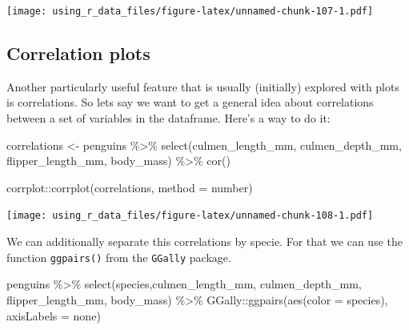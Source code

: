 \documentclass[
]{book}
\newenvironment{Shaded}{\begin{snugshade}}{\end{snugshade}}
\newcommand{\AttributeTok}[1]{\textcolor[rgb]{0.77,0.63,0.00}{#1}}
\newcommand{\FunctionTok}[1]{\textcolor[rgb]{0.00,0.00,0.00}{#1}}
\newcommand{\NormalTok}[1]{#1}
\newcommand{\OtherTok}[1]{\textcolor[rgb]{0.56,0.35,0.01}{#1}}
\newcommand{\SpecialCharTok}[1]{\textcolor[rgb]{0.00,0.00,0.00}{#1}}
\newcommand{\StringTok}[1]{\textcolor[rgb]{0.31,0.60,0.02}{#1}}
\begin{document}
\texttt{[image: using\_r\_data\_files/figure-latex/unnamed-chunk-107-1.pdf]}

\hypertarget{correlation-plots}{%
\subsection{Correlation plots}\label{correlation-plots}}

Another particularly useful feature that is usually (initially) explored with plots is correlations.
So lets say we want to get a general idea about correlations between a set of variables in the dataframe.
Here's a way to do it:

\begin{Shaded}
\begin{Highlighting}[]
\NormalTok{correlations }\OtherTok{\textless{}{-}}\NormalTok{ penguins }\SpecialCharTok{\%\textgreater{}\%} 
  \FunctionTok{select}\NormalTok{(}\StringTok{\textquotesingle{}culmen\_length\_mm\textquotesingle{}}\NormalTok{, }\StringTok{\textquotesingle{}culmen\_depth\_mm\textquotesingle{}}\NormalTok{, }\StringTok{\textquotesingle{}flipper\_length\_mm\textquotesingle{}}\NormalTok{, }\StringTok{\textquotesingle{}body\_mass\textquotesingle{}}\NormalTok{) }\SpecialCharTok{\%\textgreater{}\%} 
  \FunctionTok{cor}\NormalTok{()}

\NormalTok{corrplot}\SpecialCharTok{::}\FunctionTok{corrplot}\NormalTok{(correlations, }\AttributeTok{method =} \StringTok{\textquotesingle{}number\textquotesingle{}}\NormalTok{)}
\end{Highlighting}
\end{Shaded}

\texttt{[image: using\_r\_data\_files/figure-latex/unnamed-chunk-108-1.pdf]}

We can additionally separate this correlations by specie.
For that we can use the function \texttt{ggpairs()} from the \texttt{GGally} package.

\begin{Shaded}
\begin{Highlighting}[]
\NormalTok{penguins }\SpecialCharTok{\%\textgreater{}\%} 
  \FunctionTok{select}\NormalTok{(}\StringTok{\textquotesingle{}species\textquotesingle{}}\NormalTok{,}\StringTok{\textquotesingle{}culmen\_length\_mm\textquotesingle{}}\NormalTok{, }\StringTok{\textquotesingle{}culmen\_depth\_mm\textquotesingle{}}\NormalTok{, }\StringTok{\textquotesingle{}flipper\_length\_mm\textquotesingle{}}\NormalTok{, }\StringTok{\textquotesingle{}body\_mass\textquotesingle{}}\NormalTok{) }\SpecialCharTok{\%\textgreater{}\%} 
\NormalTok{  GGally}\SpecialCharTok{::}\FunctionTok{ggpairs}\NormalTok{(}\FunctionTok{aes}\NormalTok{(}\AttributeTok{color =}\NormalTok{ species), }\AttributeTok{axisLabels =} \StringTok{\textquotesingle{}none\textquotesingle{}}\NormalTok{)}
\end{Highlighting}
\end{Shaded}
\end{document}
